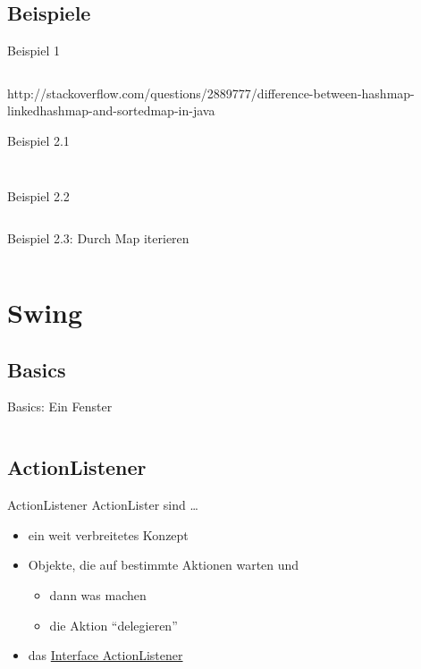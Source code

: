 \documentclass[usepdftitle=false,hyperref={pdfpagelabels=false}]{beamer}
\begin{document}
\subsection{Beispiele}
\begin{frame}{Beispiel 1}
    \inputminted[linenos=false, numbersep=5pt, tabsize=4, fontsize=\small]{java}{MapSimple.java}
http://stackoverflow.com/questions/2889777/difference-between-hashmap-linkedhashmap-and-sortedmap-in-java
\end{frame}

\begin{frame}{Beispiel 2.1}
    \inputminted[linenos=false, numbersep=5pt, tabsize=4, fontsize=\tiny, frame=lines,label=Person.java]{java}{Person.java}
    \inputminted[linenos=false, numbersep=5pt, tabsize=4, fontsize=\tiny, frame=lines,label=TelephoneNumber.java]{java}{TelephoneNumber.java}
\end{frame}

\begin{frame}{Beispiel 2.2}
    \inputminted[linenos=true, numbersep=5pt, tabsize=4, fontsize=\small]{java}{MapSimple2.java}
\end{frame}

\begin{frame}{Beispiel 2.3: Durch Map iterieren}
    \inputminted[linenos=false, numbersep=5pt, tabsize=4, fontsize=\small, firstline=15, lastline=20]{java}{singleLines.java}
\end{frame}

\section{Swing}
\subsection{Basics}
\begin{frame}{Basics: Ein Fenster}
    \inputminted[linenos=false, numbersep=5pt, tabsize=4, fontsize=\tiny]{java}{Swing1.java}
\end{frame}

\subsection{ActionListener}
\begin{frame}{ActionListener}
    ActionLister sind \dots
    \begin{itemize}[<+->]
        \item ein weit verbreitetes Konzept
        \item Objekte, die auf bestimmte Aktionen warten und 
        \begin{itemize}
            \item dann was machen
            \item die Aktion "`delegieren"'
        \end{itemize}
        \item das \href{http://docs.oracle.com/javase/7/docs/api/java/awt/event/ActionListener.html}{Interface ActionListener}
    \end{itemize}
\end{frame}
\end{document}
